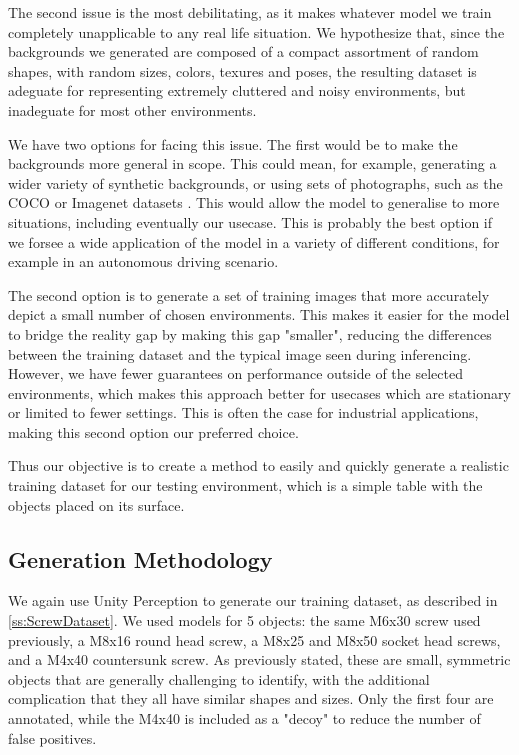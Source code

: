 The second issue is the most debilitating, as it makes whatever model we train completely unapplicable to any real life situation. We hypothesize that, since the backgrounds we generated are composed of a compact assortment of random shapes, with random sizes, colors, texures and poses, the resulting dataset is adeguate for representing extremely cluttered and noisy environments, but inadeguate for most other environments.

We have two options for facing this issue. The first would be to make the backgrounds more general in scope. This could mean, for example, generating a wider variety of synthetic backgrounds, or using sets of photographs, such as the COCO or Imagenet datasets \cite{DPOD}. This would allow the model to generalise to more situations, including eventually our usecase. This is probably the best option if we forsee a wide application of the model in a variety of different conditions, for example in an autonomous driving scenario.

The second option is to generate a set of training images that more accurately depict a small number of chosen environments. This makes it easier for the model to bridge the reality gap by making this gap "smaller", reducing the differences between the training dataset and the typical image seen during inferencing. However, we have fewer guarantees on performance outside of the selected environments, which makes this approach better for usecases which are stationary or limited to fewer settings. This is often the case for industrial applications, making this second option our preferred choice.

Thus our objective is to create a method to easily and quickly generate a realistic training dataset for our testing environment, which is a simple table with the objects placed on its surface.

\subsection{Generation Methodology}

We again use Unity Perception to generate our training dataset, as described in \ref{ss:ScrewDataset}. We used models for 5 objects: the same M6x30 screw used previously, a M8x16 round head screw, a M8x25 and M8x50 socket head screws, and a M4x40 countersunk screw. As previously stated, these are small, symmetric objects that are generally challenging to identify, with the additional complication that they all have similar shapes and sizes. Only the first four  are annotated, while the M4x40 is included as a "decoy" to reduce the number of false positives.

